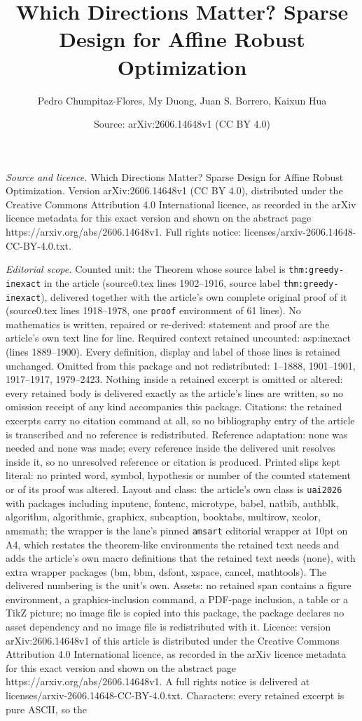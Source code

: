 \documentclass[10pt,a4paper]{amsart}
\title[Which Directions Matter? Sparse Design for Affine Robust Opt]{Which Directions Matter? Sparse Design for Affine Robust Optimization}
\author{Pedro Chumpitaz-Flores, My Duong, Juan S. Borrero, Kaixun Hua}
\date{Source: arXiv:2606.14648v1 (CC BY 4.0)}
\begin{document}
\maketitle

\noindent\emph{Source and licence.} Which Directions Matter? Sparse Design for Affine Robust Optimization. Version arXiv:2606.14648v1 (CC BY 4.0), distributed under the Creative Commons Attribution 4.0 International licence, as recorded in the arXiv licence metadata for this exact version and shown on the abstract page https://arxiv.org/abs/2606.14648v1. Full rights notice: licenses/arxiv-2606.14648-CC-BY-4.0.txt.\par\smallskip

\noindent\textit{Editorial scope.} Counted unit: the Theorem whose source label is \texttt{thm:greedy-inexact} in the article (source0.tex lines 1902--1916, source label \texttt{thm:greedy-inexact}), delivered together with the article's own complete original proof of it (source0.tex lines 1918--1978, one \texttt{proof} environment of 61 lines). No mathematics is written, repaired or re-derived: statement and proof are the article's own text line for line. Required context retained uncounted: asp:inexact (lines 1889--1900). Every definition, display and label of those lines is retained unchanged. Omitted from this package and not redistributed: 1--1888, 1901--1901, 1917--1917, 1979--2423. Nothing inside a retained excerpt is omitted or altered: every retained body is delivered exactly as the article's lines are written, so no omission receipt of any kind accompanies this package. Citations: the retained excerpts carry no citation command at all, so no bibliography entry of the article is transcribed and no reference is redistributed. Reference adaptation: none was needed and none was made; every reference inside the delivered unit resolves inside it, so no unresolved reference or citation is produced. Printed slips kept literal: no printed word, symbol, hypothesis or number of the counted statement or of its proof was altered. Layout and class: the article's own class is \texttt{uai2026} with packages including inputenc, fontenc, microtype, babel, natbib, authblk, algorithm, algorithmic, graphicx, subcaption, booktabs, multirow, xcolor, amsmath; the wrapper is the lane's pinned \texttt{amsart} editorial wrapper at 10pt on A4, which restates the theorem-like environments the retained text needs and adds the article's own macro definitions that the retained text needs (none), with extra wrapper packages (bm, bbm, dsfont, xspace, cancel, mathtools). The delivered numbering is the unit's own. Assets: no retained span contains a figure environment, a graphics-inclusion command, a PDF-page inclusion, a table or a TikZ picture; no image file is copied into this package, the package declares no asset dependency and no image file is redistributed with it. Licence: version arXiv:2606.14648v1 of this article is distributed under the Creative Commons Attribution 4.0 International licence, as recorded in the arXiv licence metadata for this exact version and shown on the abstract page https://arxiv.org/abs/2606.14648v1. A full rights notice is delivered at licenses/arxiv-2606.14648-CC-BY-4.0.txt. Characters: every retained excerpt is pure ASCII, so the 
\end{document}
